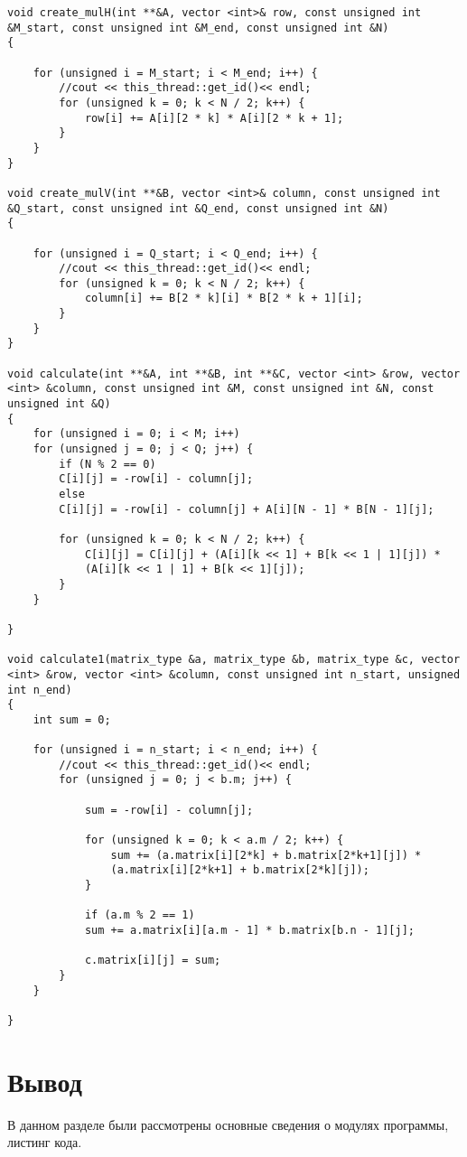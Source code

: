 \documentclass[12pt]{report}
\begin{document}
\begin{lstlisting}[label=some-code,caption=Основные вычисления для многопоточной реализации алгоритма Винограда]
void create_mulH(int **&A, vector <int>& row, const unsigned int &M_start, const unsigned int &M_end, const unsigned int &N)
{
	
	for (unsigned i = M_start; i < M_end; i++) {
		//cout << this_thread::get_id()<< endl;
		for (unsigned k = 0; k < N / 2; k++) {
			row[i] += A[i][2 * k] * A[i][2 * k + 1];
		}
	}
}

void create_mulV(int **&B, vector <int>& column, const unsigned int &Q_start, const unsigned int &Q_end, const unsigned int &N)
{
	
	for (unsigned i = Q_start; i < Q_end; i++) {
		//cout << this_thread::get_id()<< endl;
		for (unsigned k = 0; k < N / 2; k++) {
			column[i] += B[2 * k][i] * B[2 * k + 1][i];
		}
	}
}

void calculate(int **&A, int **&B, int **&C, vector <int> &row, vector <int> &column, const unsigned int &M, const unsigned int &N, const unsigned int &Q)
{
	for (unsigned i = 0; i < M; i++)
	for (unsigned j = 0; j < Q; j++) {
		if (N % 2 == 0)
		C[i][j] = -row[i] - column[j];
		else
		C[i][j] = -row[i] - column[j] + A[i][N - 1] * B[N - 1][j];
		
		for (unsigned k = 0; k < N / 2; k++) {
			C[i][j] = C[i][j] + (A[i][k << 1] + B[k << 1 | 1][j]) *
			(A[i][k << 1 | 1] + B[k << 1][j]);
		}
	}
	
}

void calculate1(matrix_type &a, matrix_type &b, matrix_type &c, vector <int> &row, vector <int> &column, const unsigned int n_start, unsigned int n_end)
{
	int sum = 0;
	
	for (unsigned i = n_start; i < n_end; i++) {
		//cout << this_thread::get_id()<< endl;
		for (unsigned j = 0; j < b.m; j++) {
			
			sum = -row[i] - column[j];
			
			for (unsigned k = 0; k < a.m / 2; k++) {
				sum += (a.matrix[i][2*k] + b.matrix[2*k+1][j]) *
				(a.matrix[i][2*k+1] + b.matrix[2*k][j]);
			}
			
			if (a.m % 2 == 1)
			sum += a.matrix[i][a.m - 1] * b.matrix[b.n - 1][j];
			
			c.matrix[i][j] = sum;
		}
	}
	
}
\end{lstlisting}

\section{Вывод}
В данном разделе были рассмотрены основные сведения о модулях программы, листинг кода.
\end{document}
